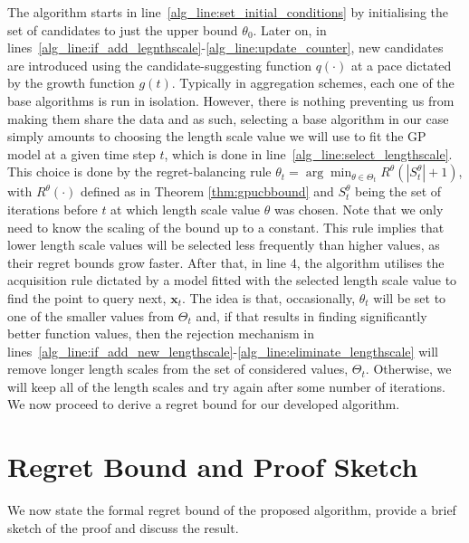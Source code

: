 \documentclass{article}
\theoremstyle{plain}
\theoremstyle{definition}
\theoremstyle{remark}
\theoremstyle{plain}
\begin{document}
The algorithm starts in line~\ref{alg_line:set_initial_conditions} by initialising the set of candidates to just the upper bound $\theta_0$. Later on, in lines~\ref{alg_line:if_add_legnthscale}-\ref{alg_line:update_counter}, new candidates are introduced using the candidate-suggesting function $q(\cdot)$ at a pace dictated by the growth function $g(t)$. Typically in aggregation schemes, each one of the base algorithms is run in isolation. However, there is nothing preventing us from making them share the data and as such, selecting a base algorithm in our case simply amounts to choosing the length scale value we will use to fit the GP model at a given time step $t$, which is done in line~\ref{alg_line:select_lengthscale}. This choice is done by the regret-balancing rule $\theta_t = \arg\min_{\theta \in \Theta_t} R^\theta(|S_t^{\theta}| + 1)$, with $R^\theta(\cdot)$ defined as in Theorem \ref{thm:gpucbbound} and $S_t^\theta$ being the set of iterations before $t$ at which length scale value $\theta$ was chosen. Note that we only need to know the scaling of the bound up to a constant. This rule implies that lower length scale values will be selected less frequently than higher values, as their regret bounds grow faster. After that, in line 4, the algorithm utilises the acquisition rule dictated by a model fitted with the selected length scale value to find the point to query next, $\bm{x}_t$.  The idea is that, occasionally, $\theta_t$ will be set to one of the smaller values from $\Theta_t$ and, if that results in finding significantly better function values, then the rejection mechanism in lines~\ref{alg_line:if_add_new_lengthscale}-\ref{alg_line:eliminate_lengthscale} will remove longer length scales from the set of considered values, $\Theta_t$. Otherwise, we will keep all of the length scales and try again after some number of iterations. We now proceed to derive a regret bound for our developed algorithm.



\section{Regret Bound and Proof Sketch}
We now state the formal regret bound of the proposed algorithm, provide a brief sketch of the proof and discuss the result.
 
\end{document}
